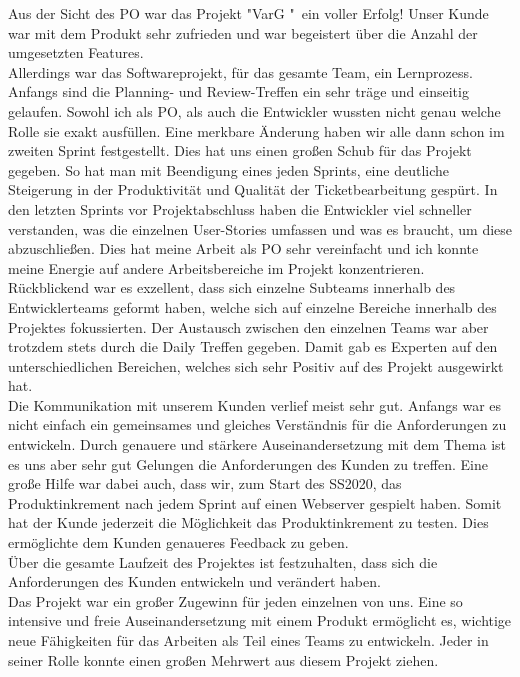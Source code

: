 \documentclass[twoside]{report}
\begin{document}
Aus der Sicht des PO war das Projekt "VarG "\ ein voller Erfolg! Unser Kunde war mit dem Produkt sehr zufrieden und war begeistert über die Anzahl der umgesetzten Features. \\
Allerdings war das Softwareprojekt, für das gesamte Team, ein Lernprozess. Anfangs sind die Planning- und Review-Treffen ein sehr träge und einseitig gelaufen. Sowohl ich als PO, als auch die Entwickler wussten nicht genau welche Rolle sie exakt ausfüllen. Eine merkbare Änderung haben wir alle dann schon im zweiten Sprint festgestellt. Dies hat uns einen großen Schub für das Projekt gegeben. So hat man mit Beendigung eines jeden Sprints, eine deutliche Steigerung in der Produktivität und Qualität der Ticketbearbeitung gespürt. In den letzten Sprints vor Projektabschluss haben die Entwickler viel schneller verstanden, was die einzelnen User-Stories umfassen und was es braucht, um diese abzuschließen. Dies hat meine Arbeit als PO sehr vereinfacht und ich konnte meine Energie auf andere Arbeitsbereiche im Projekt konzentrieren. \\
Rückblickend war es exzellent, dass sich einzelne Subteams innerhalb des Entwicklerteams geformt haben, welche sich auf einzelne Bereiche innerhalb des Projektes fokussierten. Der Austausch zwischen den einzelnen Teams war aber trotzdem stets durch die Daily Treffen gegeben. Damit gab es Experten auf den unterschiedlichen Bereichen, welches sich sehr Positiv auf des Projekt ausgewirkt hat. \\ 
Die Kommunikation mit unserem Kunden verlief meist sehr gut. Anfangs war es nicht einfach ein gemeinsames und gleiches Verständnis für die Anforderungen zu entwickeln. Durch genauere und stärkere Auseinandersetzung mit dem Thema ist es uns aber sehr gut Gelungen die Anforderungen des Kunden zu treffen. Eine große Hilfe war dabei auch, dass wir, zum Start des SS2020, das Produktinkrement nach jedem Sprint auf einen Webserver gespielt haben. Somit hat der Kunde jederzeit die Möglichkeit das Produktinkrement zu testen. Dies ermöglichte dem Kunden genaueres Feedback zu geben.\\
Über die gesamte Laufzeit des Projektes ist festzuhalten, dass sich die Anforderungen des Kunden entwickeln und verändert haben. \\
Das Projekt war ein großer Zugewinn für jeden einzelnen von uns. Eine so intensive und freie Auseinandersetzung mit einem Produkt ermöglicht es, wichtige neue Fähigkeiten für das Arbeiten als Teil eines Teams zu entwickeln. Jeder in seiner Rolle konnte einen großen Mehrwert aus diesem Projekt ziehen. \\
 
\end{document}
